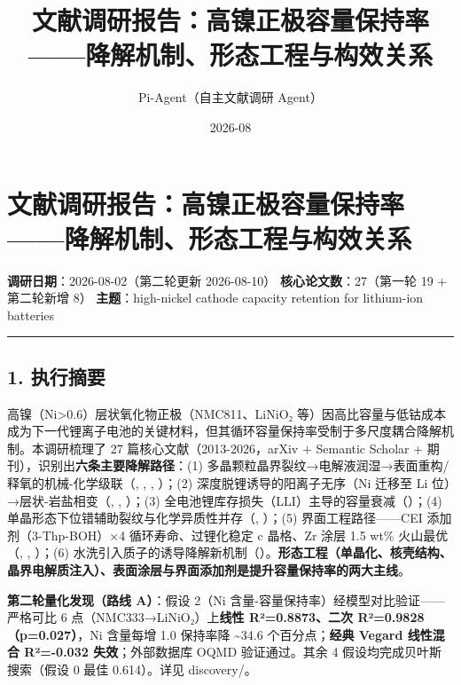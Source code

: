 \documentclass[12pt,a4paper]{ctexart}
\title{ 文献调研报告：高镍正极容量保持率——降解机制、形态工程与构效关系 }
\date{ 2026-08 }
\author{Pi-Agent（自主文献调研 Agent）}
\begin{document}
\maketitle
\sloppy  %

\section{文献调研报告：高镍正极容量保持率------降解机制、形态工程与构效关系}\label{ux6587ux732eux8c03ux7814ux62a5ux544aux9ad8ux954dux6b63ux6781ux5bb9ux91cfux4fddux6301ux7387ux964dux89e3ux673aux5236ux5f62ux6001ux5de5ux7a0bux4e0eux6784ux6548ux5173ux7cfb}

\textbf{调研日期}：2026-08-02（第二轮更新 2026-08-10） \textbar{} \textbf{核心论文数}：27（第一轮 19 + 第二轮新增 8） \textbar{} \textbf{主题}：high-nickel cathode capacity retention for lithium-ion batteries

\begin{center}\rule{0.5\linewidth}{0.5pt}\end{center}

\subsection{1. 执行摘要}\label{ux6267ux884cux6458ux8981}

高镍（Ni\textgreater0.6）层状氧化物正极（NMC811、LiNiO₂ 等）因高比容量与低钴成本成为下一代锂离子电池的关键材料，但其循环容量保持率受制于多尺度耦合降解机制。本调研梳理了 27 篇核心文献（2013-2026，arXiv + Semantic Scholar + 期刊），识别出\textbf{六条主要降解路径}：(1) 多晶颗粒晶界裂纹→电解液润湿→表面重构/释氧的机械-化学级联（\cite{p06}, \cite{p24}, \cite{p31}, \cite{p32}）；(2) 深度脱锂诱导的阳离子无序（Ni 迁移至 Li 位）→层状-岩盐相变（\cite{p27}, \cite{p32}, \cite{p44}）；(3) 全电池锂库存损失（LLI）主导的容量衰减（\cite{p28}）；(4) 单晶形态下位错辅助裂纹与化学异质性并存（\cite{p25}, \cite{p24}）；(5) 界面工程路径------CEI 添加剂（3-Thp-BOH）×4 循环寿命、过锂化稳定 c 晶格、Zr 涂层 1.5 wt\% 火山最优（\cite{p43}, \cite{p44}, \cite{p46}）；(6) 水洗引入质子的诱导降解新机制（\cite{p48}）。\textbf{形态工程（单晶化、核壳结构、晶界电解质注入）、表面涂层与界面添加剂是提升容量保持率的两大主线}。

\textbf{第二轮量化发现（路线 A）}：假设 2（Ni 含量-容量保持率）经模型对比验证------严格可比 6 点（NMC333→LiNiO₂）上\textbf{线性 R²=0.8873、二次 R²=0.9828（p=0.027）}，Ni 含量每增 1.0 保持率降 \textasciitilde34.6 个百分点；\textbf{经典 Vegard 线性混合 R²=-0.032 失效}；外部数据库 OQMD 验证通过。其余 4 假设均完成贝叶斯搜索（假设 0 最佳 0.614）。详见 discovery/。
\end{document}
